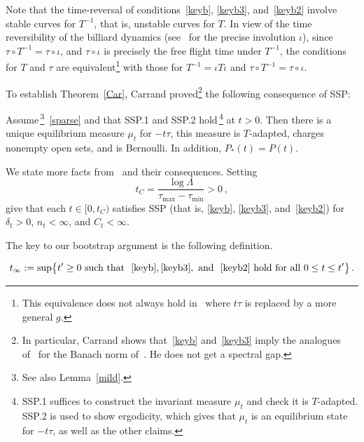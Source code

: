 \documentclass[AHL,Unicode,longabstracts,published]{cedram}
\begin{document}
Note that the time-reversal of conditions~\eqref{keyb}, \eqref{keyb3}, and~\eqref{keyb2} involve stable curves for $T^{-1}$, that is, unstable curves for $T$. In view of the time reversibility of the billiard dynamics (see~\cite[\S~2.14]{CM} for the precise involution $\iota$), since $\tau \circ T^{-1}=\tau\circ \iota$, and $\tau \circ \iota$ is precisely the free flight time under $T^{-1}$, the conditions for $T$ and $\tau$ are equivalent\footnote{This equivalence does not always hold in~\cite{Ca} where $t\tau$ is replaced by a more general $g$.} with those for $T^{-1}=\iota T\iota$ and $\tau \circ T^{-1}=\tau\circ \iota$.


To establish Theorem~\ref{Car}, Carrand proved\footnote{In particular, Carrand shows that~\eqref{keyb} and~\eqref{keyb3} imply the analogues~\cite[Propositions~3.7 and 3.10]{Ca} of~\cite[Propositions~3.14 and 3.15]{BD2} for the Banach norm of~\cite{BD1}. He does not get a spectral gap.} the following consequence of SSP:

\begin{prop}[{\cite[Theorem~1.2]{Ca}}]\label{Car3}
Assume\,\footnote{See also Lemma~\ref{mild}.}~\eqref{sparse} and that
SSP.1 and SSP.2 hold\,\footnote{SSP.1 suffices to construct the invariant measure $\mu_t$ and check it is $T$-adapted. SSP.2 is used to show ergodicity, which gives that $\mu_t$ is an equilibrium state for $-t\tau$, as well as the other claims.} at $t>0$. Then there is a unique equilibrium measure $\mu_t$ for $-t\tau$, this measure is $T$-adapted, charges nonempty open sets, and is Bernoulli. In addition, $P_*(t)=P(t)$.
\end{prop}


We state more facts from~\cite{Ca} and their consequences. Setting
\begin{equation}\label{deftC}
t_C=\frac {\log \Lambda}{\tau_{\max} -\tau_{\min}} >0\,,
\end{equation}
\cite[Lemmas~3.3 and~3.4 and Corollary~3.6]{Ca} give that each $t\in [0,t_C)$ satisfies SSP (that is, \eqref{keyb}, \eqref{keyb3}, and~\eqref{keyb2}) for $\delta_t>0$, $n_t<\infty$, and $C_t<\infty$.


The key to our bootstrap argument is the following definition.

\begin{defi}
\begin{equation}\label{bart}
t_\infty:=\sup\bigl \{ t'\ge 0 \text{ such that }~\eqref{keyb}, \eqref{keyb3}, \text{ and }~\eqref{keyb2} \text{ hold for all } 0\le t\le t'\bigr \} \,.
\end{equation}
\end{defi}
\end{document}
